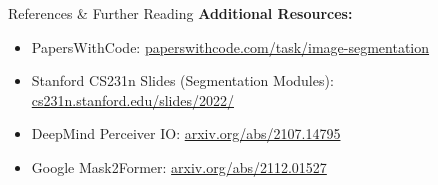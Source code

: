 \begin{frame}[allowframebreaks]{References \& Further Reading}
    \vspace{1em}
    \textbf{Additional Resources:}
    \begin{itemize}
        \item PapersWithCode: \href{https://paperswithcode.com/task/image-segmentation}{paperswithcode.com/task/image-segmentation}
        \item Stanford CS231n Slides (Segmentation Modules): \href{http://cs231n.stanford.edu/slides/2022/}{cs231n.stanford.edu/slides/2022/}
        \item DeepMind Perceiver IO: \href{https://arxiv.org/abs/2107.14795}{arxiv.org/abs/2107.14795}
        \item Google Mask2Former: \href{https://arxiv.org/abs/2112.01527}{arxiv.org/abs/2112.01527}
    \end{itemize}
\end{frame}